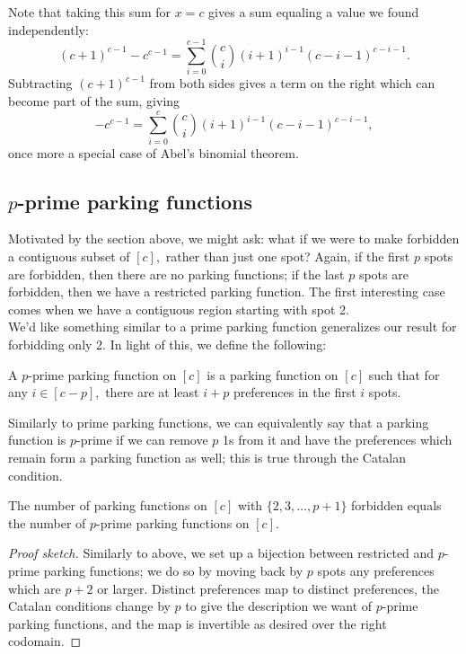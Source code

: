 Note that taking this sum for $x=c$ gives a sum equaling a value we found independently: $$(c+1)^{c-1}-c^{c-1}=\sum_{i=0}^{c-1}\binom{c}{i}(i+1)^{i-1}(c-i-1)^{c-i-1}.$$ Subtracting $(c+1)^{c-1}$ from both sides gives a term on the right which can become part of the sum, giving $$-c^{c-1}=\sum_{i=0}^{c}\binom{c}{i}(i+1)^{i-1}(c-i-1)^{c-i-1},$$ once more a special case of Abel's binomial theorem.

\subsection*{$p$-prime parking functions}

Motivated by the section above, we might ask: what if we were to make forbidden a contiguous subset of $[c],$ rather than just one spot? Again, if the first $p$ spots are forbidden, then there are no parking functions; if the last $p$ spots are forbidden, then we have a restricted parking function. The first interesting case comes when we have a contiguous region starting with spot 2.\\

We'd like something similar to a prime parking function generalizes our result for forbidding only 2. In light of this, we define the following:\\

\begin{definition} A $p$-prime parking function on $[c]$ is a parking function on $[c]$ such that for any $i\in[c-p],$ there are at least $i+p$ preferences in the first $i$ spots.
\end{definition}


Similarly to prime parking functions, we can equivalently say that a parking function is $p$-prime if we can remove $p$ 1s from it and have the preferences which remain form a parking function as well; this is true through the Catalan condition.

\begin{proposition}
    The number of parking functions on $[c]$ with $\{2,3,\ldots,p+1\}$ forbidden equals the number of $p$-prime parking functions on $[c].$
\end{proposition}

\begin{proof}[Proof sketch]
    Similarly to above, we set up a bijection between restricted and $p$-prime parking functions; we do so by moving back by $p$ spots any preferences which are $p+2$ or larger. Distinct preferences map to distinct preferences, the Catalan conditions change by $p$ to give the description we want of $p$-prime parking functions, and the map is invertible as desired over the right codomain.
\end{proof}

